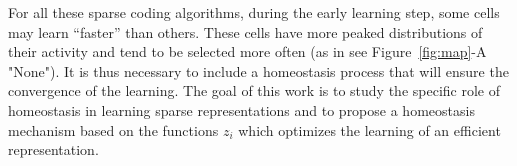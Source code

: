 \documentclass[vision,article,submit,oneauthor,pdftex]{Definitions/mdpi}
\begin{document}
{%
For all these sparse coding algorithms, during the early learning step, some cells may learn ``faster'' than others. These cells have more peaked distributions of their activity and tend to be selected more often (as in see Figure~\ref{fig:map}-A "None"). It is thus necessary to include a homeostasis process that will ensure the convergence of the learning. The goal of this work is to study the specific role of homeostasis in learning sparse representations and to propose a homeostasis mechanism based on the functions $z_i$ which optimizes the learning of an efficient representation.%
}
\end{document}
